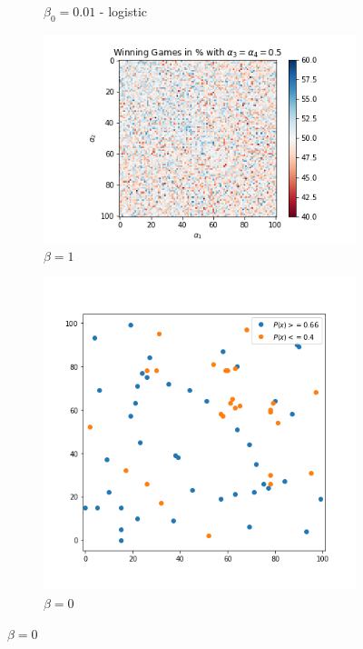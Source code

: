 \begin{figure}[!hb]
\begin{subfigure}{0.3\textwidth}
	    \caption{$\beta_0=0.01$ - logistic}
	    \label{fig:20}
    \end{subfigure}%
	\begin{subfigure}{0.3\textwidth}
	    \centering
	    \includegraphics[width=1\linewidth]{Bilder/simulation_4_2}
	    \caption{$\beta=1$}
	    \label{fig:21}
	\end{subfigure}
	\begin{subfigure}{.3\textwidth}
    	\centering
    	\includegraphics[width=1\linewidth]{Bilder/simulation_2_3}
    	\caption{$\beta=0$}

\end{subfigure}
\end{figure}
